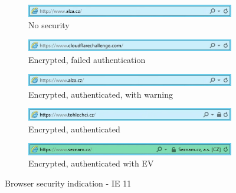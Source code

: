 \begin{figure}
  \begin{subfigure}[b]{\textwidth}
    \centering
    \includegraphics[scale=0.6]{images/browsers/ie-none.png}
    \caption{No security}
  \end{subfigure}
  \begin{subfigure}[b]{\textwidth}
    \centering
    \includegraphics[scale=0.6]{images/browsers/ie-untrusted.png}
    \caption{Encrypted, failed authentication}
  \end{subfigure}
  \begin{subfigure}[b]{\textwidth}
    \centering
    \includegraphics[scale=0.6]{images/browsers/ie-warning.png}
    \caption{Encrypted, authenticated, with warning}
  \end{subfigure}
  \begin{subfigure}[b]{\textwidth}
    \centering
    \includegraphics[scale=0.6]{images/browsers/ie-dv.png}
    \caption{Encrypted, authenticated}
  \end{subfigure}
  \begin{subfigure}[b]{\textwidth}
    \centering
    \includegraphics[scale=0.6]{images/browsers/ie-ev.png}
    \caption{Encrypted, authenticated with EV}
  \end{subfigure}
  \caption{Browser security indication - IE 11}
\end{figure}

